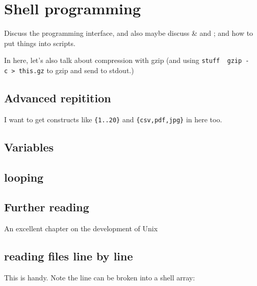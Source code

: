 \documentclass[]{krantz}
\begin{document}
\hypertarget{shell-programming}{%
\chapter{Shell programming}\label{shell-programming}}

Discuss the programming interface, and also maybe discuss \& and ;
and how to put things into scripts.

In here, let's also talk about compression with gzip (and using \texttt{stuff\ \textbar{}\ gzip\ -c\ \textgreater{}\ this.gz} to gzip and send to stdout.)

\hypertarget{advanced-repitition}{%
\section{Advanced repitition}\label{advanced-repitition}}

I want to get constructs like \texttt{\{1..20\}} and \texttt{\{csv,pdf,jpg\}} in here too.

\hypertarget{variables}{%
\section{Variables}\label{variables}}

\hypertarget{looping}{%
\section{looping}\label{looping}}

\hypertarget{further-reading}{%
\section{Further reading}\label{further-reading}}

An excellent chapter on the development of Unix \citep{RaymondArtUNIXProgramming2003}

\hypertarget{reading-files-line-by-line}{%
\section{reading files line by line}\label{reading-files-line-by-line}}

This is handy. Note the line can be broken into a shell array:
\end{document}
